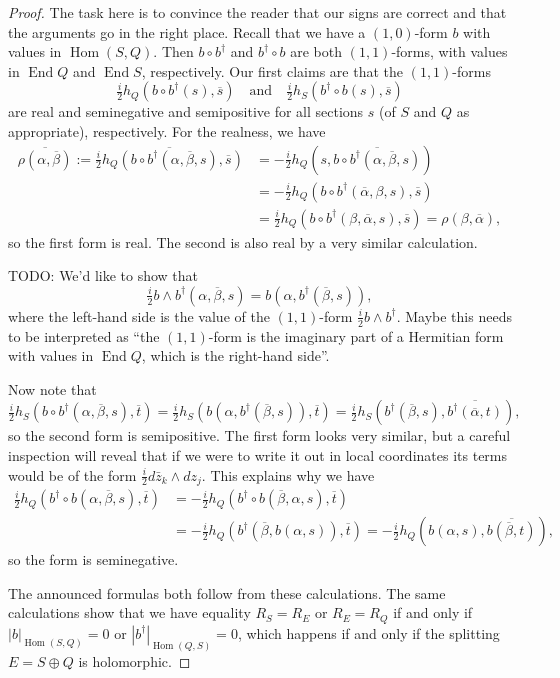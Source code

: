 \documentclass[10pt,a4paper]{article}
\newtheorem*{proof}{Proof}
\def\qandq{\quad\text{and}\quad}
\def\ov#1{\overline{#1}}
\DeclareMathOperator{\End}{End}
\DeclareMathOperator{\Hom}{Hom}
\begin{document}
\begin{proof}
The task here is to convince the reader that our signs are correct and that the arguments go in the right place. Recall that we have a $(1,0)$-form $b$ with values in $\Hom(S,Q)$. Then $b \circ b^\dagger$ and $b^\dagger \circ b$ are both $(1,1)$-forms, with values in $\End Q$ and $\End S$, respectively. Our first claims are that the $(1,1)$-forms
\[
\tfrac i2 h_Q(b \circ b^\dagger(s), \ov s)
\qandq
\tfrac i2 h_S(b^\dagger \circ b(s), \ov s)
\]
are real and seminegative and semipositive for all sections $s$ (of $S$ and $Q$ as appropriate), respectively. For the realness, we have
\begin{align*}
\overline{\rho(\alpha, \ov\beta)}
:= \overline{\tfrac i2 h_Q(b \circ b^\dagger(\alpha, \ov\beta, s), \ov s)}
&= -\tfrac i2 h_Q(s, \ov{b \circ b^\dagger(\alpha,\ov\beta, s)})
\\
&= -\tfrac i2 h_Q(b \circ b^\dagger(\ov\alpha, \beta, s), \ov{s})
\\
&= \tfrac i2 h_Q(b \circ b^\dagger(\beta, \ov\alpha, s), \ov{s})
= \rho(\beta, \ov\alpha),
\end{align*}
so the first form is real. The second is also real by a very similar calculation.

TODO: We'd like to show that
\[
\tfrac i2 b \wedge b^\dagger (\alpha, \ov\beta, s)
= b(\alpha, b^\dagger(\ov\beta, s)),
\]
where the left-hand side is the value of the $(1,1)$-form $\frac i2 b \wedge b^\dagger$. Maybe this needs to be interpreted as ``the $(1,1)$-form is the imaginary part of a Hermitian form with values in $\End Q$, which is the right-hand side''.

Now note that
\[
\tfrac i2 h_S(b \circ b^\dagger(\alpha, \ov\beta, s), \ov t)
= \tfrac i2 h_S(b(\alpha, b^\dagger(\ov \beta, s)), \ov t)
= \tfrac i2 h_S(b^\dagger(\ov \beta, s), \ov{b^\dagger(\ov \alpha, t)}),
\]
so the second form is semipositive. The first form looks very similar, but a careful inspection will reveal that if we were to write it out in local coordinates its terms would be of the form $\frac i2 d\bar z_k \wedge dz_j$. This explains why we have
\begin{align*}
\tfrac i2 h_Q(b^\dagger \circ b(\alpha, \ov\beta, s), \ov t)
&= -\tfrac i2 h_Q(b^\dagger \circ b(\ov\beta, \alpha, s), \ov t)
\\
&= -\tfrac i2 h_Q(b^\dagger(\ov\beta, b(\alpha, s)), \ov t)
= -\tfrac i2 h_Q(b(\alpha, s), \ov{b(\ov\beta, t)}),
\end{align*}
so the form is seminegative.

The announced formulas both follow from these calculations. The same calculations show that we have equality $R_S = R_E$ or $R_E = R_Q$ if and only if $|b|_{\Hom(S,Q)} = 0$ or $|b^\dagger|_{\Hom(Q,S)} = 0$, which happens if and only if the splitting $E = S \oplus Q$ is holomorphic.
\end{proof}








\end{document}
